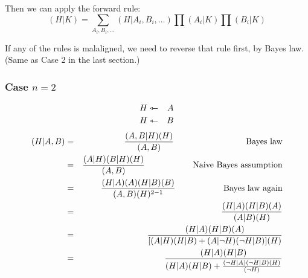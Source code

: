 Then we can apply the forward rule:
$$ (H|K) = \sum_{A_i,B_i,...} (H|A_i,B_i,...) \prod (A_i|K) \prod (B_i|K) $$

If any of the rules is malaligned, we need to reverse that rule first, by Bayes law.
(Same as Case 2 in the last section.)

\subsubsection{Case $n=2$}
\begin{eqnarray}
H &\leftarrowtriangle& A \nonumber \\
H &\leftarrowtriangle& B \nonumber
\end{eqnarray}
\begin{eqnarray}
(H|A,B) &=& \frac{ (A,B|H)(H) } { (A,B) } \tab\tab\tab \mbox{Bayes law} \nonumber \\
 &=& \frac{ (A|H) (B|H) (H) }{ (A,B) } \tab\tab \mbox{Naive Bayes assumption} \nonumber \\
 &=& \frac{ (H|A) (A) (H|B) (B) }{ (A,B) (H)^{2-1} } \tab\tab \mbox{Bayes law again} \nonumber \\
 &=& \frac{ (H|A) (H|B) (A) }{ (A|B) (H) } \nonumber \\
 &=& \frac{ (H|A) (H|B) (A) }{ [ (A|H)(H|B) + (A|\neg H)(\neg H|B) ] (H) } \nonumber \\
 &=& \frac{ (H|A) (H|B) }{ (H|A)(H|B) + \frac{(\neg H|A)(\neg H|B)(H)}{(\neg H)} } \nonumber
\end{eqnarray}

